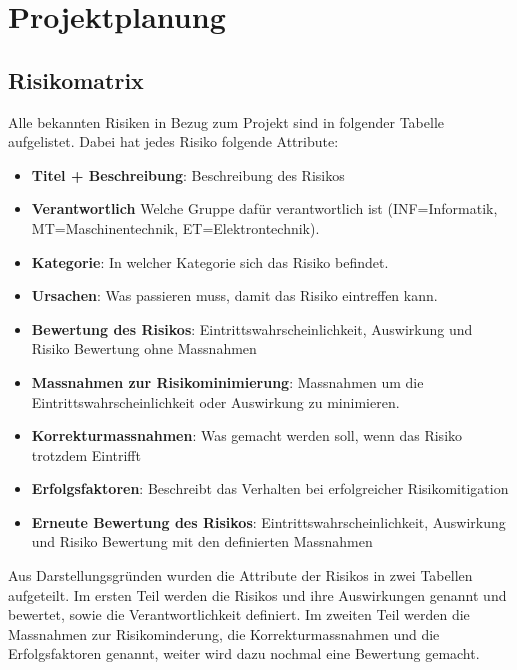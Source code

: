 \documentclass[../main.tex]{subfiles}
\begin{document}
\newpage
\section{Projektplanung}

\subsection{Risikomatrix} \label{risikomatrix}

Alle bekannten Risiken in Bezug zum Projekt sind in folgender Tabelle aufgelistet.
Dabei hat jedes Risiko folgende Attribute:
\begin{itemize}
    \item \textbf{Titel + Beschreibung}: Beschreibung des Risikos
    \item \textbf{Verantwortlich} Welche Gruppe dafür verantwortlich ist (INF=Informatik, MT=Maschinentechnik, ET=Elektrontechnik).
    \item \textbf{Kategorie}: In welcher Kategorie sich das Risiko befindet.
    \item \textbf{Ursachen}: Was passieren muss, damit das Risiko eintreffen kann.
    \item \textbf{Bewertung des Risikos}: Eintrittswahrscheinlichkeit, Auswirkung und Risiko Bewertung ohne Massnahmen
    \item \textbf{Massnahmen zur Risikominimierung}: Massnahmen um die Eintrittswahrscheinlichkeit oder Auswirkung zu minimieren.
    \item \textbf{Korrekturmassnahmen}: Was gemacht werden soll, wenn das Risiko trotzdem Eintrifft
    \item \textbf{Erfolgsfaktoren}: Beschreibt das Verhalten bei erfolgreicher Risikomitigation
    \item \textbf{Erneute Bewertung des Risikos}: Eintrittswahrscheinlichkeit, Auswirkung und Risiko Bewertung mit den definierten Massnahmen
\end{itemize}

Aus Darstellungsgründen wurden die Attribute der Risikos in zwei Tabellen aufgeteilt. Im ersten Teil werden die Risikos und ihre Auswirkungen genannt und bewertet, sowie die Verantwortlichkeit definiert. Im zweiten Teil werden die Massnahmen zur Risikominderung, die Korrekturmassnahmen und die Erfolgsfaktoren genannt, weiter wird dazu nochmal eine Bewertung gemacht.
\end{document}
